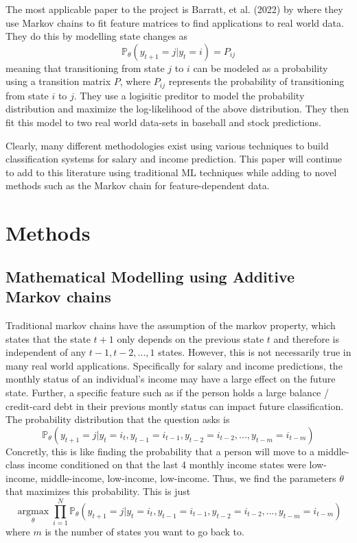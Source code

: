 \documentclass{article}
\begin{document}
The most applicable paper to the project is Barratt, et al. (2022) \cite{barratt} by where they use Markov chains to fit feature matrices to find applications to real world data. They do this by modelling state changes as 
$$\mathbb{P}_{\theta}(y_{t+1} = j | y_t = i) = P_{ij}$$
meaning that transitioning from state $j$ to $i$ can be modeled as a probability using a transition matrix $P$, where $P_{ij}$ represents the probability of transitioning from state $i$ to $j$. They use a logisitic preditor to model the probability distribution and maximize the log-likelihood of the above distribution. They then fit this model to two real world data-sets in baseball and stock predictions. 

Clearly, many different methodologies exist using various techniques to build classification systems for salary and income prediction. This paper will continue to add to this literature using traditional ML techniques while adding to novel methods such as the Markov chain for feature-dependent data. 

\section{Methods}

\subsection{Mathematical Modelling using Additive Markov chains}

Traditional markov chains have the assumption of the markov property, which states that the state $t+1$ only depends on the previous state $t$ and therefore is independent of any $t-1, t-2, ..., 1$ states. However, this is not necessarily true in many real world applications. Specifically for salary and income predictions, the monthly status of an individual's income may have a large effect on the future state. Further, a specific feature such as if the person holds a large balance / credit-card debt in their previous montly status can impact future classification.
The probability distribution that the question asks is
$$\mathbb{P}_{\theta}(y_{t+1} = j | y_t = i_{t}, y_{t-1} = i_{t-1}, y_{t-2} = i_{t-2}, ..., y_{t-m} = i_{t-m})$$
Concretly, this is like finding the probability that a person will move to a middle-class income conditioned on that the last 4 monthly income states were low-income, middle-income, low-income, low-income. Thus, we find the parameters $\theta$ that maximizes this probability.  This is just
$$\underset{\theta}{\operatorname{argmax}} \prod_{i=1}^N \mathbb{P}_{\theta}(y_{t+1} = j | y_t = i_{t}, y_{t-1} = i_{t-1}, y_{t-2} = i_{t-2}, ..., y_{t-m} = i_{t-m})$$
where $m$ is the number of states you want to go back to. 
\end{document}
